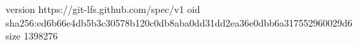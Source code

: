 version https://git-lfs.github.com/spec/v1
oid sha256:ed6b66e4db5b3c30578b120c0db8aba0dd31dd2ea36e0dbb6a317552960029d6
size 1398276
